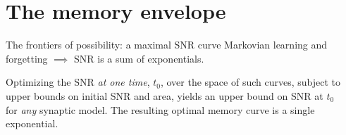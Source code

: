 \documentclass[final,hyperref={pdfpagelabels=false,bookmarks=false}]{beamer}
\begin{document}
\begin{frame}{}
\begin{columns}[t]
\begin{column}{0.37\linewidth}
\end{column}

\begin{column}{0.32\linewidth}



\section{The memory envelope}



\begin{block}{The frontiers of possibility: a maximal SNR curve}
%
 Markovian learning and forgetting $\implies$ SNR is a sum of exponentials.

 \vp Optimizing the SNR \emph{at one time}, $t_0$, over the space of such curves, 
 subject to upper bounds on initial SNR and area, 
 yields an upper bound on SNR at $t_0$ for \emph{any} synaptic model.
 The resulting optimal memory curve is a single exponential.


\end{block}
\end{column}
\end{columns}
\end{frame}
\end{document}

